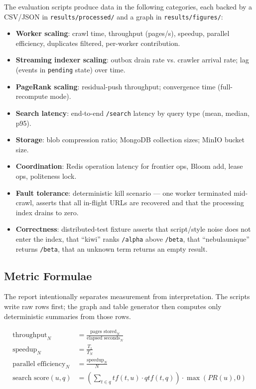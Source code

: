 \documentclass[11pt,a4paper]{article}
\newcommand{\code}[1]{\texttt{#1}}
\begin{document}
The evaluation scripts produce data in the following categories, each backed by a CSV/JSON in \code{results/processed/} and a graph in \code{results/figures/}:

\begin{itemize}[leftmargin=1.4em]
  \item \textbf{Worker scaling}: crawl time, throughput (pages/s), speedup, parallel efficiency, duplicates filtered, per-worker contribution.
  \item \textbf{Streaming indexer scaling}: outbox drain rate vs. crawler arrival rate; lag (events in \code{pending} state) over time.
  \item \textbf{PageRank scaling}: residual-push throughput; convergence time (full-recompute mode).
  \item \textbf{Search latency}: end-to-end \code{/search} latency by query type (mean, median, p95).
  \item \textbf{Storage}: blob compression ratio; MongoDB collection sizes; MinIO bucket size.
  \item \textbf{Coordination}: Redis operation latency for frontier ops, Bloom add, lease ops, politeness lock.
  \item \textbf{Fault tolerance}: deterministic kill scenario --- one worker terminated mid-crawl, asserts that all in-flight URLs are recovered and that the processing index drains to zero.
  \item \textbf{Correctness}: distributed-test fixture asserts that script/style noise does not enter the index, that ``kiwi'' ranks \code{/alpha} above \code{/beta}, that ``nebulaunique'' returns \code{/beta}, that an unknown term returns an empty result.
\end{itemize}

\subsection{Metric Formulae}

The report intentionally separates measurement from interpretation. The scripts write raw rows first; the graph and table generator then computes only deterministic summaries from those rows.

\begin{align}
\text{throughput}_N &= \frac{\text{pages stored}_N}{\text{elapsed seconds}_N}\\
\text{speedup}_N &= \frac{T_1}{T_N}\\
\text{parallel efficiency}_N &= \frac{\text{speedup}_N}{N}\\
\text{search score}(u, q) &= \left(\sum_{t \in q} tf(t,u) \cdot qtf(t,q)\right) \cdot \max(PR(u), 0)
\end{align}
\end{document}
